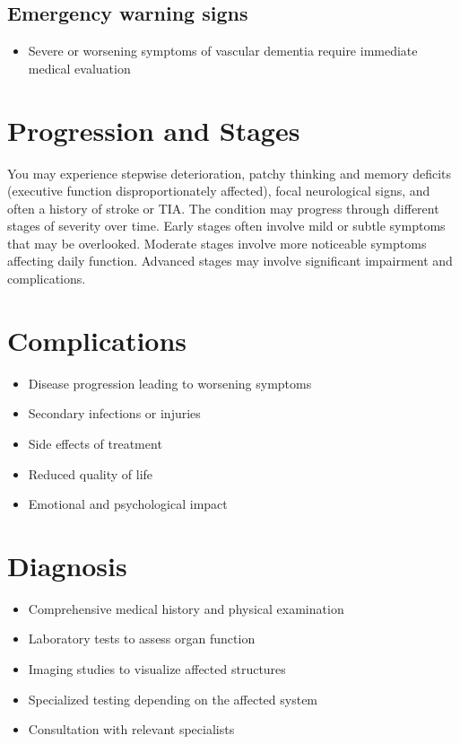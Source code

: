 \subsection{Emergency warning signs}
\begin{itemize}[noitemsep]
  \item Severe or worsening symptoms of vascular dementia require immediate medical evaluation
\end{itemize}
\section{Progression and Stages}
You may experience stepwise deterioration, patchy thinking and memory deficits (executive function disproportionately affected), focal neurological signs, and often a history of stroke or TIA. The condition may progress through different stages of severity over time. Early stages often involve mild or subtle symptoms that may be overlooked. Moderate stages involve more noticeable symptoms affecting daily function. Advanced stages may involve significant impairment and complications.
\section{Complications}
\begin{itemize}[noitemsep]
  \item Disease progression leading to worsening symptoms
  \item Secondary infections or injuries
  \item Side effects of treatment
  \item Reduced quality of life
  \item Emotional and psychological impact
\end{itemize}
\section{Diagnosis}
\begin{itemize}[noitemsep]
  \item Comprehensive medical history and physical examination
  \item Laboratory tests to assess organ function
  \item Imaging studies to visualize affected structures
  \item Specialized testing depending on the affected system
  \item Consultation with relevant specialists
\end{itemize}

